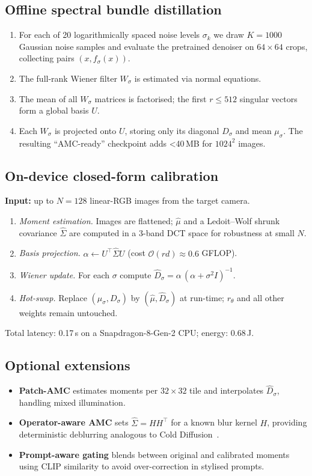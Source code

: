 \documentclass{article} %
\begin{document}
\subsection{Offline spectral bundle distillation}
\begin{enumerate}
  \item For each of 20 logarithmically spaced noise levels $\sigma_{k}$ we draw $K=1000$ Gaussian noise samples and evaluate the pretrained denoiser on $64\times64$ crops, collecting pairs $(x,f_{\sigma}(x))$.
  \item The full-rank Wiener filter $W_{\sigma}$ is estimated via normal equations.
  \item The mean of all $W_{\sigma}$ matrices is factorised; the first $r\le512$ singular vectors form a global basis $U$.
  \item Each $W_{\sigma}$ is projected onto $U$, storing only its diagonal $D_{\sigma}$ and mean $\mu_{\sigma}$. The resulting ``AMC-ready'' checkpoint adds \textless{}40\,MB for $1024^{2}$ images.
\end{enumerate}

\subsection{On-device closed-form calibration}
\textbf{Input:} up to $N=128$ linear-RGB images from the target camera.
\begin{enumerate}[label=(\alph*)]
  \item \emph{Moment estimation.} Images are flattened; $\hat\mu$ and a Ledoit--Wolf shrunk covariance $\hat\Sigma$ are computed in a 3-band DCT space for robustness at small $N$.
  \item \emph{Basis projection.} $\alpha \leftarrow U^{\top}\hat\Sigma U$ (cost $\mathcal O(rd)\approx0.6$ GFLOP).
  \item \emph{Wiener update.} For each $\sigma$ compute $\hat D_{\sigma}=\alpha\,(\alpha+\sigma^{2}I)^{-1}$.
  \item \emph{Hot-swap.} Replace $(\mu_{\sigma},D_{\sigma})$ by $(\hat\mu,\hat D_{\sigma})$ at run-time; $r_{\theta}$ and all other weights remain untouched.
\end{enumerate}
Total latency: 0.17\,s on a Snapdragon-8-Gen-2 CPU; energy: 0.68\,J.

\subsection{Optional extensions}
\begin{itemize}
  \item\textbf{Patch-AMC} estimates moments per $32\times32$ tile and interpolates $\hat D_{\sigma}$, handling mixed illumination.
  \item\textbf{Operator-aware AMC} sets $\hat\Sigma=HH^{\top}$ for a known blur kernel $H$, providing deterministic deblurring analogous to Cold Diffusion~\cite{bansal_2022_cold}.
  \item\textbf{Prompt-aware gating} blends between original and calibrated moments using CLIP similarity to avoid over-correction in stylised prompts.
\end{itemize}
\end{document}
